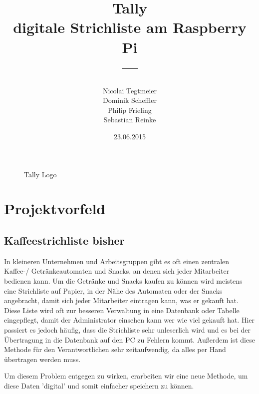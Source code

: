 \documentclass[11pt,a4paper]{article} %
\title{\normalfont\bfseries{Tally\\ digitale Strichliste am Raspberry Pi}\\---}
\author{Nicolai Tegtmeier \\ Dominik Scheffler \\ Philip Frieling \\ Sebastian Reinke}
\date{23.06.2015}
\begin{document}



\begin{titlepage}
	\maketitle
	\begin{figure}[h]
	\caption{Tally Logo}
	\end{figure}
\end{titlepage}

\tableofcontents
\newpage

\section{Projektvorfeld}
\label{Grundlagen}


\subsection{Kaffeestrichliste bisher}

In kleineren Unternehmen und Arbeitsgruppen gibt es oft einen zentralen Kaffee-/ Getränkeautomaten und Snacks, an denen sich jeder Mitarbeiter bedienen kann. Um die Getränke und Snacks kaufen zu können wird meistens eine Strichliste auf Papier, in der Nähe des Automaten oder der Snacks angebracht, damit sich jeder Mitarbeiter eintragen kann, was er gekauft hat. Diese Liste wird oft zur besseren Verwaltung in eine Datenbank oder Tabelle eingepflegt, damit der Administrator einsehen kann wer wie viel gekauft hat. Hier passiert es jedoch häufig, dass die Strichliste sehr unleserlich wird und es bei der Übertragung in die Datenbank auf den PC zu Fehlern kommt. Außerdem ist diese Methode für den Verantwortlichen sehr zeitaufwendig, da alles per Hand übertragen werden muss.
\par
Um diesem Problem entgegen zu wirken, erarbeiten wir eine neue Methode, um diese Daten 'digital' und somit einfacher speichern zu können.
\end{document}
